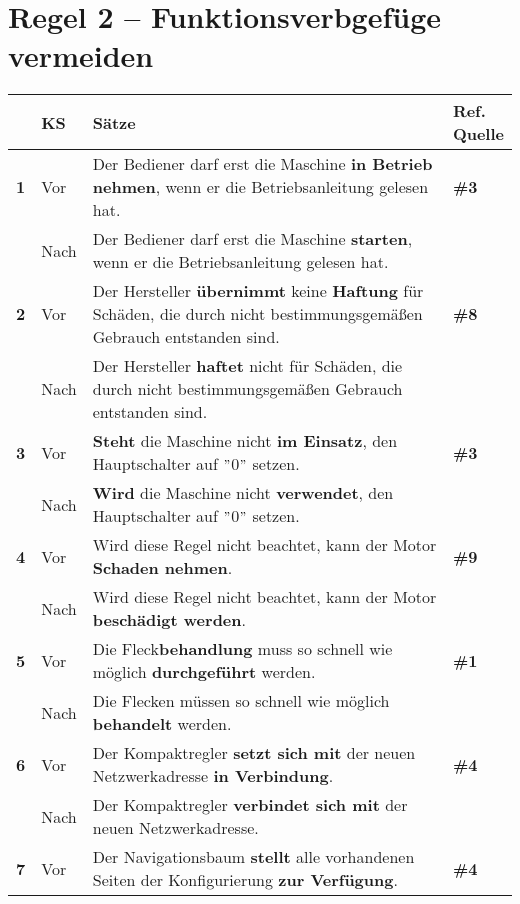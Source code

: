 \section*{Regel 2 -- Funktionsverbgefüge vermeiden}

\begin{longtable}{llp{}l}

\lsptoprule
{} & \textbf{KS} & \textbf{Sätze} & \makecell[tl]{\textbf{Ref.}\\\textbf{Quelle}}\\
\midrule
{ \textbf{1}} & Vor & Der Bediener darf erst die Maschine \textbf{in Betrieb nehmen}, wenn er die Betriebsanleitung gelesen hat. & \textbf{\#3}\\
& Nach & Der Bediener darf erst die Maschine \textbf{starten}, wenn er die Betriebsanleitung gelesen hat. & \\
\tablevspace
{ \textbf{2}} & Vor & Der Hersteller \textbf{übernimmt} keine \textbf{Haftung} für Schäden, die durch nicht bestimmungsgemäßen Gebrauch entstanden sind. & \textbf{\#8}\\
& Nach & Der Hersteller \textbf{haftet} nicht für Schäden, die durch nicht bestimmungsgemäßen Gebrauch entstanden sind. & \\
\tablevspace
{ \textbf{3}} & Vor & \textbf{Steht} die Maschine nicht \textbf{im Einsatz}, den Hauptschalter auf $"$0$"$ setzen. & \textbf{\#3}\\
& Nach & \textbf{Wird} die Maschine nicht \textbf{verwendet}, den Hauptschalter auf $"$0$"$ setzen. & \\
\tablevspace
{ \textbf{4}} & Vor & Wird diese Regel nicht beachtet, kann der Motor \textbf{Schaden nehmen}. & \textbf{\#9}\\
& Nach & Wird diese Regel nicht beachtet, kann der Motor \textbf{beschädigt werden}. & \\
\tablevspace
{ \textbf{5}} & Vor & Die Fleck\textbf{behandlung} muss so schnell wie möglich \textbf{durchgeführt} werden. & \textbf{\#1}\\
& Nach & Die Flecken müssen so schnell wie möglich \textbf{behandelt} werden. & \\
\tablevspace
{ \textbf{6}} & Vor & Der Kompaktregler \textbf{setzt sich mit} der neuen Netzwerkadresse \textbf{in Verbindung}. & \textbf{\#4}\\
& Nach & Der Kompaktregler \textbf{verbindet sich mit} der neuen Netzwerkadresse. & \\
\tablevspace
{ \textbf{7}} & Vor & Der Navigationsbaum \textbf{stellt} alle vorhandenen Seiten der Konfigurierung \textbf{zur Verfügung}. & \textbf{\#4}\\

\end{longtable}
